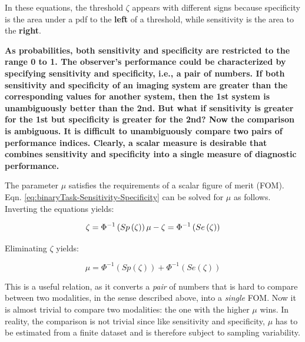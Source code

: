 \documentclass[
]{book}
\begin{document}
In these equations, the threshold \(\zeta\) appears with different signs because specificity is the area under a pdf to the \textbf{left} of a threshold, while sensitivity is the area to the \textbf{right}.

\textbf{As probabilities, both sensitivity and specificity are restricted to the range 0 to 1. The observer's performance could be characterized by specifying sensitivity and specificity, i.e., a pair of numbers. If both sensitivity and specificity of an imaging system are greater than the corresponding values for another system, then the 1st system is unambiguously better than the 2nd. But what if sensitivity is greater for the 1st but specificity is greater for the 2nd? Now the comparison is ambiguous. It is difficult to unambiguously compare two pairs of performance indices. Clearly, a scalar measure is desirable that combines sensitivity and specificity into a single measure of diagnostic performance.}

The parameter \(\mu\) satisfies the requirements of a scalar figure of merit (FOM). Eqn. \eqref{eq:binaryTask-Sensitivity-Specificity} can be solved for \(\mu\) as follows. Inverting the equations yields:

\begin{equation} 
\zeta =\Phi^{-1} \left (Sp\left ( \zeta \right )  \right )\\
\mu - \zeta = \Phi^{-1} \left (Se\left ( \zeta \right )  \right )
\label{eq:binaryTask-SolveForMuZeta}
\end{equation}

Eliminating \(\zeta\) yields:

\begin{equation} 
\mu = \Phi^{-1} \left (Sp\left ( \zeta \right )  \right ) + \Phi^{-1} \left (Se\left ( \zeta \right )  \right )
\label{eq:binaryTask-SolveForMu}
\end{equation}

This is a useful relation, as it converts a \emph{pair} of numbers that is hard to compare between two modalities, in the sense described above, into a \emph{single} FOM. Now it is almost trivial to compare two modalities: the one with the higher \(\mu\) wins. In reality, the comparison is not trivial since like sensitivity and specificity, \(\mu\) has to be estimated from a finite dataset and is therefore subject to sampling variability.
\end{document}
